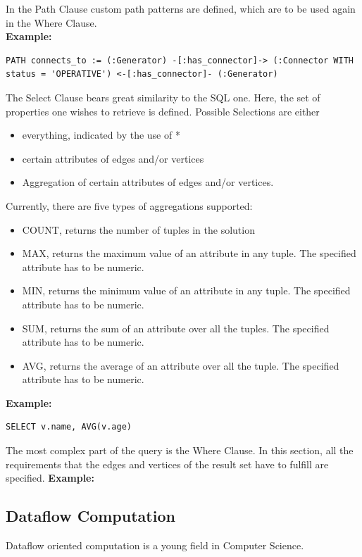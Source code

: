 \documentclass[11pt,singlecolumn]{scrartcl}
\begin{document}
In the Path Clause custom path patterns are defined, which are to be used again in the Where Clause.\\
\textbf{Example:}\\
\begin{lstlisting}
PATH connects_to := (:Generator) -[:has_connector]-> (:Connector WITH status = 'OPERATIVE') <-[:has_connector]- (:Generator)
 \end{lstlisting}
The Select Clause bears great similarity to the SQL one. Here, the set of properties one wishes to retrieve is defined. Possible Selections are either\\
\begin{itemize} 
\item everything, indicated by the use of * 
\item certain attributes of edges and/or vertices
\item Aggregation of certain attributes of edges and/or vertices.
\end{itemize}
 Currently, there are five types of aggregations supported:\\
 \begin{itemize} 
\item COUNT, returns the number of tuples in the solution 
\item MAX, returns the maximum value of an attribute in any tuple. The specified attribute has to be numeric.
\item MIN, returns the minimum value of an attribute in any tuple. The specified attribute has to be numeric.
\item SUM, returns the sum of an attribute over all the tuples. The specified attribute has to be numeric.
\item AVG, returns the average of an attribute over all the tuple. The specified attribute has to be numeric.
\end{itemize}
\textbf{Example:}\\
\begin{lstlisting}
SELECT v.name, AVG(v.age)
 \end{lstlisting} 
The most complex part of the query is the Where Clause. In this section, all the requirements that the edges and vertices of the result set have to fulfill are specified.
\textbf{Example:}\\

\clearpage
\subsection{Dataflow Computation}
Dataflow oriented computation is a young field in Computer Science.
\end{document}
